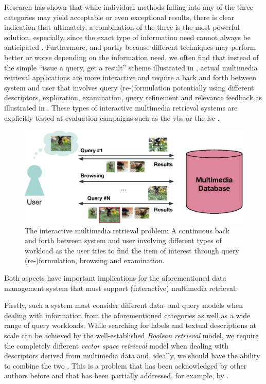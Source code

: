 Research has shown that while individual methods falling into any of the three categories may yield acceptable or even exceptional results, there is clear indication that ultimately, a combination of the three is the most powerful solution, especially, since the exact type of information need cannot always be anticipated \cite{Rossetto:2020Interactive}. Furthermore, and partly because different techniques may perform better or worse depending on the information need, we often find that instead of the simple ``issue a query, get a result'' scheme illustrated in , actual multimedia retrieval applications are more interactive and require a back and forth between system and user \cite{Lokovc:2022Task} that involves query (re-)formulation potentially using different descriptors, exploration, examination, query refinement and relevance feedback \cite{Lokovc:2019Interactive,Gurrin:2019Invited} as illustrated in . These types of interactive multimedia retrieval systems are explicitly tested at evaluation campaigns such as the \acrfull{vbs} \cite{Schoeffmann:2019Video} or the \acrfull{lsc} \cite{Gurrin:2021Introduction}.

\begin{figure}[tb]
    \centering
    \includegraphics[width=\textwidth]{figures/mr-actual.eps}
    \caption{The interactive multimedia retrieval problem: A continuous back and forth between system and user involving different types of workload as the user tries to find the item of interest through query (re-)formulation, browsing and examination.}
    \label{figure:mr-actual}
\end{figure}
 
Both aspects have important implications for the aforementioned data management system that must support (interactive) multimedia retrieval:

Firstly, such a system must consider different data- and query models when dealing with information from the aforementioned categories as well as a wide range of query workloads. While searching for labels and textual descriptions at scale can be achieved by the well-established \emph{Boolean retrieval} model, we require the completely different \emph{vector space retrieval} model when dealing with descriptors derived from multimedia data and, ideally, we should have the ability to combine the two \cite{Heller:2020Multi}. This is a problem that has been acknowledged by other authors before \cite{Jonson:2016Ten} and that has been partially addressed, for example, by \cite{Giangreco:2018Database,Giangreco:2016Adam,Wang:2021Milvus}.

